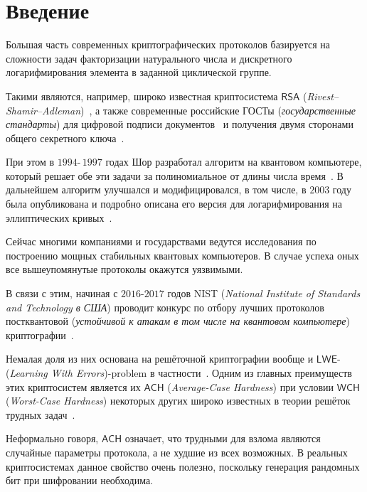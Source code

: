 \section{Введение}
\label{sec:Chapter0} 


Большая часть современных криптографических протоколов базируется на сложности задач факторизации натурального числа и дискретного логарифмирования элемента в заданной циклической группе.

Такими являются, например, широко известная криптосистема $\mathsf{RSA}$ ({\it Rivest–Shamir–Adleman})~\cite{RSA}, а также современные российские ГОСТы ({\it государственные стандарты}) для цифровой подписи документов~\cite{GOST_signature} и получения двумя сторонами общего секретного ключа~\cite{GOST_key_generation}.

При этом в $1994$\;-\,$1997$ годах Шор разработал алгоритм на квантовом компьютере, который решает обе эти задачи за полиномиальное от длины числа время~\cite{Shor}. В дальнейшем алгоритм улучшался и модифицировался, в том числе, в $2003$ году была опубликована и подробно описана его версия для логарифмирования на эллиптических кривых~\cite{Ell_curves}.

Сейчас многими компаниями и государствами ведутся исследования по построению мощных стабильных квантовых компьютеров. В случае успеха оных все вышеупомянутые протоколы окажутся уязвимыми.

В связи с этим, начиная с $2016$\;-\:$2017$ годов NIST ({\it National Institute of Standards and Technology в США}) проводит конкурс по отбору лучших протоколов постквантовой ({\it устойчивой к атакам в том числе на квантовом компьютере}) криптографии~\cite{NIST_status}.

Немалая доля из них основана на решёточной криптографии вообще и $\mathsf{LWE}$-({\it Learning With Errors})-problem в частности~\cite{LWE}. Одним из главных преимуществ этих криптосистем является их $\mathsf{ACH}$ ({\it Average-Case Hardness}) при условии $\mathsf{WCH}$ ({\it Worst-Case Hardness}) некоторых других широко известных в теории решёток трудных задач~\cite{ACH_Ajtai}.

Неформально говоря, $\mathsf{ACH}$ означает, что трудными для взлома являются случайные параметры протокола, а не худшие из всех возможных. В реальных криптосистемах данное свойство очень полезно, поскольку генерация рандомных бит при шифровании необходима.

